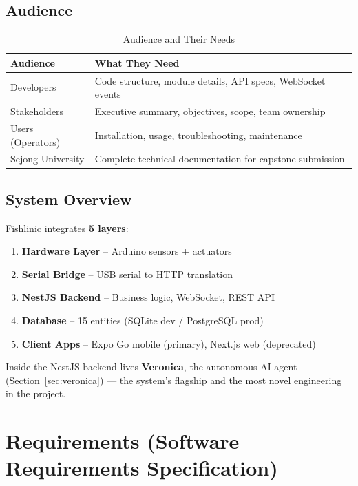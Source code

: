 \documentclass[12pt,a4paper,oneside]{article}
\begin{document}
\subsection{Audience}
\begin{table}[H]
    \centering\small
    \begin{tabularx}{\textwidth}{Xl}
        \toprule
        \textbf{Audience} & \textbf{What They Need} \\
        \midrule
        Developers & Code structure, module details, API specs, WebSocket events \\
        Stakeholders & Executive summary, objectives, scope, team ownership \\
        Users (Operators) & Installation, usage, troubleshooting, maintenance \\
        Sejong University & Complete technical documentation for capstone submission \\
        \bottomrule
    \end{tabularx}
    \caption{Audience and Their Needs}
\end{table}

\subsection{System Overview}
Fishlinic integrates \textbf{5 layers}:
\begin{enumerate}
    \item \textbf{Hardware Layer} -- Arduino sensors + actuators
    \item \textbf{Serial Bridge} -- USB serial to HTTP translation
    \item \textbf{NestJS Backend} -- Business logic, WebSocket, REST API
    \item \textbf{Database} -- 15 entities (SQLite dev / PostgreSQL prod)
    \item \textbf{Client Apps} -- Expo Go mobile (primary), Next.js web (deprecated)
\end{enumerate}

Inside the NestJS backend lives \textbf{Veronica}, the autonomous AI agent (Section~\ref{sec:veronica}) --- the system's flagship and the most novel engineering in the project.

\newpage
\section{Requirements (Software Requirements Specification)}
\end{document}
